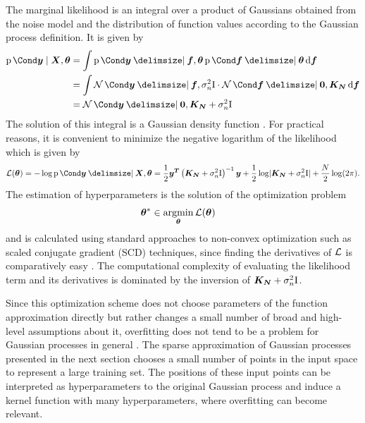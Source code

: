 The marginal likelihood is an integral over a product of Gaussians obtained from the noise model and the distribution of function values according to the Gaussian process definition.
It is given by
\begin{align}
    \begin{split}
        \label{eq:gp_f_marginalization}
        \Prob{\mat{y} \mid \mat{X}, \mat{\theta}} &= \int \Prob{\mat{y} \given \mat{f}, \mat{\theta}} \Prob{\mat{f} \given \mat{\theta}} \diff \mat{f} \\
        &= \int \Gaussian{\mat{y} \given \mat{f}, \sigma_n^2 \Eye} \cdot \Gaussian{\mat{f} \given \mat{0}, \mat{K_N}} \diff \mat{f} \\
        &= \Gaussian{\mat{y} \given \mat{0}, \mat{K_N} + \sigma_n^2 \Eye}
    \end{split}
\end{align}
The solution of this integral is a Gaussian density function \cite{petersen_matrix_2008}.
For practical reasons, it is convenient to minimize the negative logarithm of the likelihood which is given by
\begin{align}
    \Ell(\mat{\theta}) = -\log\Prob{\mat{y} \given \mat{X}, \mat{\theta}} =
    \frac{1}{2} \mat{y^T} \left( \mat{K_N} + \sigma_n^2 \Eye \right)^{-1} \mat{y} +
    \frac{1}{2} \log \abs{\mat{K_N} + \sigma_n^2 \Eye} +
    \frac{N}{2} \log(2\pi).
\end{align}
The estimation of hyperparameters is the solution of the optimization problem
\begin{align}
    \bm{\theta}^\ast &\in \operatorname*{argmin}_{\bm{\theta}} \operatorname{\mathcal{L}}(\bm{\theta})
\end{align}
and is calculated using standard approaches to non-convex optimization such as scaled conjugate gradient (SCD) techniques, since finding the derivatives of $\operatorname{\mathcal{L}}$ is comparatively easy \cite{rasmussen_gaussian_2006}.
The computational complexity of evaluating the likelihood term and its derivatives is dominated by the inversion of $\bm{K_N} + \sigma_n^2 \mathrm{I}$.

Since this optimization scheme does not choose parameters of the function approximation directly but rather changes a small number of broad and high-level assumptions about it, overfitting does not tend to be a problem for Gaussian processes in general \cite{snelson_flexible_2007}.
The sparse approximation of Gaussian processes presented in the next section chooses a small number of points in the input space to represent a large training set.
The positions of these input points can be interpreted as hyperparameters to the original Gaussian process and induce a kernel function with many hyperparameters, where overfitting can become relevant.

